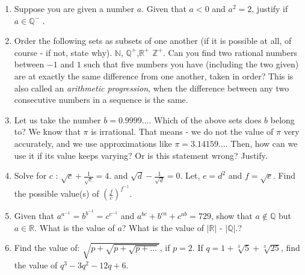\documentclass[8pt]{extarticle}
\begin{document}
\begin{enumerate}
\item Suppose you are given a number $a$. Given that $a<0$ and $a^2 = 2$, justify if $a \in \mathbb{Q^-}$ .
\item Order the following sets as subsets of one another (if it is possible at all, of course - if not, state why). $\mathbb{N}$, $\mathbb{Q^+}$,$\mathbb{R^+}$ $\mathbb{Z^+}$. Can you find two rational numbers between $-1$ and $1$ such that five numbers you have (including the two given) are at exactly the same difference from one another, taken in order? This is also called an \textit{arithmetic progression}, when the difference between any two consecutive numbers in a sequence is the same.
\item Let us take the number $b = 0.9999 \ldots$. Which of the above sets does $b$ belong to? We know that $\pi$ is irrational. That means - we do not the value of $\pi$ very accurately, and we use approximations like $\pi = 3.14159\ldots$. Then, how can we use it if its value keeps varying? Or is this statement wrong? Justify.
\item Solve for $c$ : $\sqrt{c} + \frac{1}{\sqrt{c}} = 4. $ and  $\sqrt{d} - \frac{1}{\sqrt{d}} = 0. $ Let, $e=d^2$ and $f=\sqrt{e}$. Find the possible value(s) of ${ \left( \frac{f}{c} \right)}^{f^{-1}}$.
\item Given that $a^{a^{-1}} = b^{b^{-1}} = c^{c^{-1}}$ and $a^{bc} + b^{ca} + c^{ab} = 729$, show that $a \notin \mathbb{Q}$ but $a \in \mathbb{R}$. What is the value of $a$? What is the value of  $\left\vert{\mathbb{R}}\right\vert$ - $\left\vert{\mathbb{Q}}\right\vert$.?
\item Find the value of: $\sqrt{p + \sqrt{p + \sqrt{p + \ldots}}}$, if $p = 2$. If $q = 1 + \sqrt[3]{5} + \sqrt[3]{25}$, find the value of $q^3 - 3q^2 - 12q + 6$.
\end{enumerate}

\end{document}
